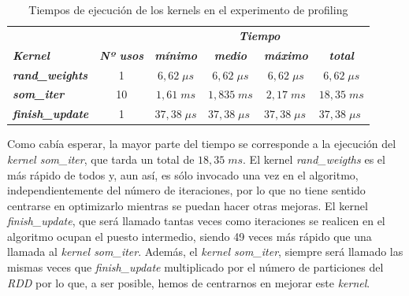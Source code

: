 \begin{table}[ht]
\begin{tabular}{@{}|lc|cccc|@{}}
\toprule
                                 & \multicolumn{1}{l|}{}                               & \multicolumn{4}{c|}{\textit{\textbf{Tiempo}}}                                                                                         \\
\textit{\textbf{Kernel}}         & \multicolumn{1}{l|}{\textit{\textbf{Nº usos}}} & \textit{\textbf{mínimo}} & \textit{\textbf{medio}}           & \textit{\textbf{máximo}}          & \textit{\textbf{total}}            \\ \midrule
\textit{\textbf{rand\_weights}}  & 1                                                   & $6,62 \; \mu s$             & $6,62 \; \mu s$                      & $6,62 \;\mu s$                      & $6,62 \;\mu s$                       \\
\textit{\textbf{som\_iter}}      & 10                                                  & $1,61 \; ms$                & $1,835 \; ms$                        & $2,17 \;ms$                         & $18,35 \;ms$                         \\
\textit{\textbf{finish\_update}} & 1                                                   & $37,38 \; \mu s$            & \multicolumn{1}{l}{$37,38\; \mu s$} & \multicolumn{1}{l}{$37,38 \;\mu s$} & \multicolumn{1}{l|}{$37,38 \;\mu s$} \\ \bottomrule
\end{tabular}
\caption{Tiempos de ejecución de los kernels en el experimento de profiling}
\label{tab:profsomkernels}
\end{table}

Como cabía esperar, la mayor parte del tiempo se corresponde a la ejecución del \textit{kernel som\_iter}, que tarda un total de $18,35 \; ms$. El kernel \textit{rand\_weigths} es el más rápido de todos y, aun así, es sólo invocado una vez en el algoritmo, independientemente del número de iteraciones, por lo que no tiene sentido centrarse en optimizarlo mientras se puedan hacer otras mejoras. El kernel \textit{finish\_update}, que será llamado tantas veces como iteraciones se realicen en el algoritmo ocupan el puesto intermedio, siendo 49 veces más rápido que una llamada al \textit{kernel som\_iter}. Además, el \textit{kernel som\_iter}, siempre será llamado las mismas veces que \textit{finish\_update} multiplicado por el número de particiones del \textit{RDD} por lo que, a ser posible, hemos de centrarnos en mejorar este \textit{kernel}.\\

